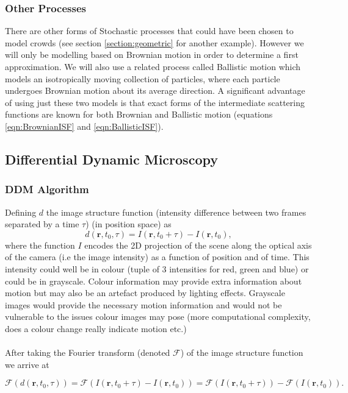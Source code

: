 \documentclass[10pt]{article}
\begin{document}
\subsubsection{Other Processes}
There are other forms of Stochastic processes that could have been chosen to model crowds (see section \ref{section:geometric} for another example). However we will only be modelling based on Brownian motion in order to determine a first approximation. We will also use a related process called Ballistic motion which models an isotropically moving collection of particles, where each particle undergoes Brownian motion about its average direction. A significant advantage of using just these two models is that exact forms of the intermediate scattering functions are known for both Brownian and Ballistic motion (equations \ref{eqn:BrownianISF} and \ref{eqn:BallisticISF}). 

\subsection{Differential Dynamic Microscopy}
\subsubsection{DDM Algorithm}
Defining $d$ the image structure function (intensity difference between two frames separated by a time $\tau$) (in position space) as
\begin{equation}
    d(\textbf{r}, t_0, \tau) = I(\mathbf{r}, t_0 + \tau) - I(\mathbf{r}, t_0),
\end{equation}
where the function $I$ encodes the 2D projection of the scene along the optical axis of the camera (i.e the image intensity) as a function of position and of time. This intensity could well be in colour (tuple of 3 intensities for red, green and blue) or could be in grayscale. Colour information may provide extra information about motion but may also be an artefact produced by lighting effects. Grayscale images would provide the necessary motion information and would not be vulnerable to the issues colour images may pose (more computational complexity, does a colour change really indicate motion etc.)
\\\\
After taking the Fourier transform (denoted $ \mathscr{F}$) of the image structure function we arrive at

\begin{equation}
    \mathscr{F} (d(\textbf{r}, t_0, \tau) ) = \mathscr{F} (I(\mathbf{r}, t_0 + \tau) - I(\mathbf{r}, t_0)) = \mathscr{F}(I(\mathbf{r}, t_0 + \tau)) - \mathscr{F}(I(\mathbf{r}, t_0)).
\end{equation}
\end{document}
